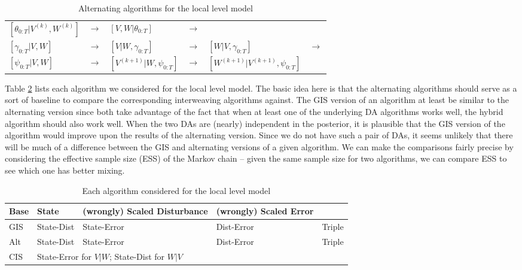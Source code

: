 \documentclass{article}
\begin{document}
\begin{table}[!h]
\begin{enumerate}
    \begin{center}
      \begin{tabular}{llllll}
        $[\theta_{0:T}|V^{(k)},W^{(k)}]$&$\to$&$ [V,W|\theta_{0:T}]$&$ \to$&&\\
        $[\gamma_{0:T}|V,W]$&$ \to$&$ [V|W,\gamma_{0:T}]$&$ \to$&$ [W|V,\gamma_{0:T}]$& $\to$\\
        $[\psi_{0:T}|V,W]$& $\to$& $[V^{(k+1)}|W,\psi_{0:T}]$& $\to$& $[W^{(k+1)}|V^{(k+1)},\psi_{0:T}]$&
      \end{tabular}
    \end{center}
\end{enumerate}
\caption{Alternating algorithms for the local level model}
\label{altalgorithms}
\end{table}

Table \ref{LLMalgorithms} lists each algorithm we considered for the local level model. The basic idea here is that the alternating algorithms should serve as a sort of baseline to compare the corresponding interweaving algorithms against. The GIS version of an algorithm at least be similar to the alternating version since both take advantage of the fact that when at least one of the underlying DA algorithms works well, the hybrid algorithm should also work well. When the two DAs are (nearly) independent in the posterior, it is plausible that the GIS version of the algorithm would improve upon the results of the alternating version. Since we do not have such a pair of DAs, it seems unlikely that there will be much of a difference between the GIS and alternating versions of a given algorithm. We can make the comparisons fairly precise by considering the effective sample size (ESS) of the Markov chain -- given the same sample size for two algorithms, we can compare ESS to see which one has better mixing.

\begin{table}[!ht]
  \centering
  \begin{tabular}{|l||l|l|l|l|}\hline
    Base & State & (wrongly) Scaled Disturbance & (wrongly) Scaled Error & \\\hline
    GIS & State-Dist & State-Error & Dist-Error & Triple \\
    Alt & State-Dist & State-Error & Dist-Error & Triple \\
    CIS & \multicolumn{3}{l|}{State-Error for $V|W$; State-Dist for $W|V$} & \\
    \hline
  \end{tabular}
  \caption{Each algorithm considered for the local level model}
  \label{LLMalgorithms}
\end{table}
\end{document}
